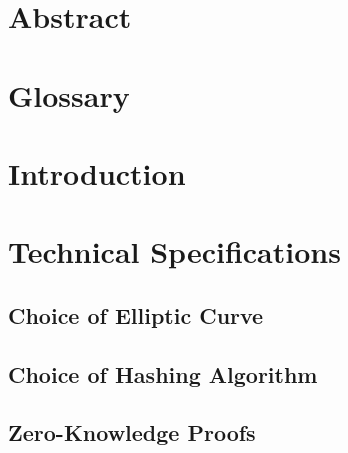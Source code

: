 \documentclass[a4paper, 12pt]{book}
\begin{document}
\chapter*{Abstract}


\tableofcontents


\chapter*{Glossary} \label{Cha:Glo}





\chapter*{Introduction} \label{Cha:Int}
 

 
 
\chapter{Technical Specifications} \label{Cha:Tec}



\section{Choice of Elliptic Curve}\label{Sec:EC}



\section{Choice of Hashing Algorithm}\label{Sec:Has}



\section{Zero-Knowledge Proofs}\label{Sec:ZKP}
\end{document}
